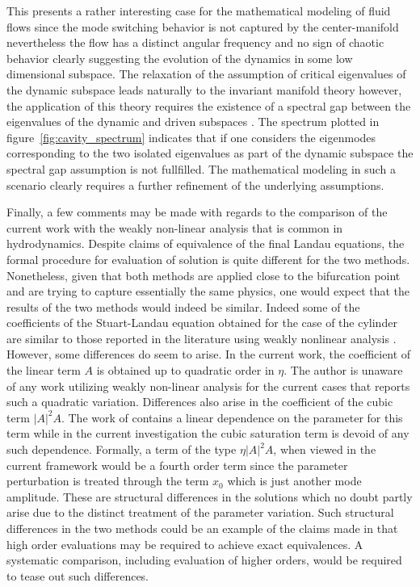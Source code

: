 This presents a rather interesting case for the mathematical modeling of fluid flows since the mode switching behavior is not captured by the center-manifold nevertheless the flow has a distinct angular frequency and no sign of chaotic behavior clearly suggesting the evolution of the dynamics in some low dimensional subspace. The relaxation of the assumption of critical eigenvalues of the dynamic subspace leads naturally to the invariant manifold theory however, the application of this theory requires the existence of a spectral gap between the eigenvalues of the dynamic and driven subspaces \citep{chicone06}. The spectrum plotted in figure~\ref{fig:cavity_spectrum} indicates that if one considers the eigenmodes corresponding to the two isolated eigenvalues as part of the dynamic subspace the spectral gap assumption is not fullfilled. The mathematical modeling in such a scenario clearly requires a further refinement of the underlying assumptions. 

Finally, a few comments may be made with regards to the comparison of the current work with the weakly non-linear analysis that is common in hydrodynamics. Despite claims of equivalence \citep{fujimara91} of the final Landau equations, the formal procedure for evaluation of solution is quite different for the two methods. Nonetheless, given that both methods are applied close to the bifurcation point and are trying to capture essentially the same physics, one would expect that the results of the two methods would indeed be similar. Indeed some of the coefficients of the Stuart-Landau equation obtained for the case of the cylinder are similar to those reported in the literature using weakly nonlinear analysis \citep{sipp07}. However, some differences do seem to arise. In the current work, the coefficient of the linear term $A$ is obtained up to quadratic order in $\eta$. The author is unaware of any work utilizing weakly non-linear analysis for the current cases that reports such a quadratic variation. Differences also arise in the coefficient of the cubic term $|A|^{2}A$. The work of \cite{sipp07} contains a linear dependence on the parameter for this term while in the current investigation the cubic saturation term is devoid of any such dependence. Formally, a term of the type $\eta|A|^{2}A$, when viewed in the current framework would be a fourth order term since the parameter perturbation is treated through the term $x_{0}$ which is just another mode amplitude. These are structural differences in the solutions which no doubt partly arise due to the distinct treatment of the parameter variation. Such structural differences in the two methods could be an example of the claims made in \cite{fujimara91} that high order evaluations may be required to achieve exact equivalences. A systematic comparison, including evaluation of higher orders, would be required to tease out such differences. 

